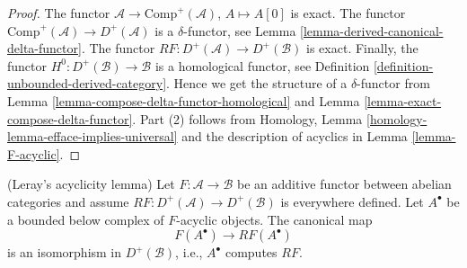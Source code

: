 \begin{proof}
The functor $\mathcal{A} \to \text{Comp}^{+}(\mathcal{A})$,
$A \mapsto A[0]$ is exact. The functor
$\text{Comp}^{+}(\mathcal{A}) \to D^{+}(\mathcal{A})$
is a $\delta$-functor, see
Lemma \ref{lemma-derived-canonical-delta-functor}.
The functor $RF : D^{+}(\mathcal{A}) \to D^{+}(\mathcal{B})$ is exact.
Finally, the functor $H^0 : D^{+}(\mathcal{B}) \to \mathcal{B}$
is a homological functor, see
Definition \ref{definition-unbounded-derived-category}.
Hence we get the structure of a $\delta$-functor from
Lemma \ref{lemma-compose-delta-functor-homological}
and
Lemma \ref{lemma-exact-compose-delta-functor}.
Part (2) follows from
Homology, Lemma \ref{homology-lemma-efface-implies-universal}
and the description of acyclics in
Lemma \ref{lemma-F-acyclic}.
\end{proof}

\begin{lemma}
\label{lemma-leray-acyclicity}
(Leray's acyclicity lemma)
Let $F : \mathcal{A} \to \mathcal{B}$ be an additive functor
between abelian categories and assume
$RF : D^{+}(\mathcal{A}) \to D^{+}(\mathcal{B})$ is everywhere defined.
Let $A^\bullet$ be a bounded below complex of $F$-acyclic objects.
The canonical map
$$
F(A^\bullet) \longrightarrow RF(A^\bullet)
$$
is an isomorphism in $D^{+}(\mathcal{B})$, i.e., $A^\bullet$ computes
$RF$.
\end{lemma}

